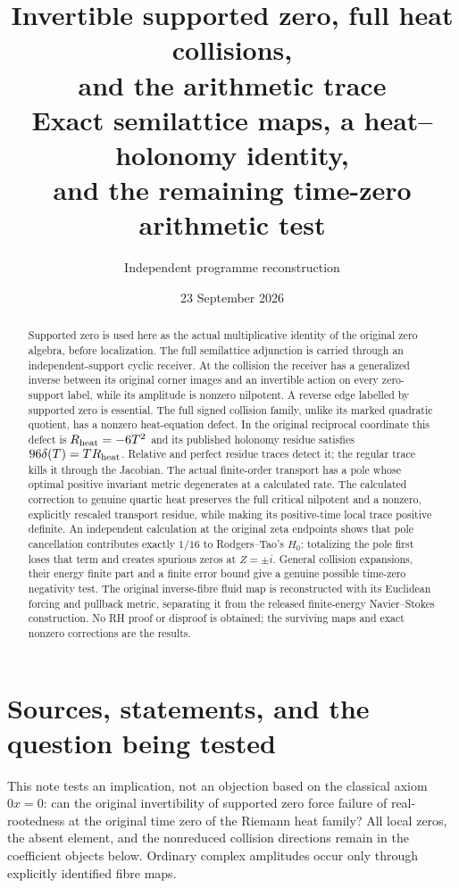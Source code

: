 \documentclass[11pt,a4paper]{article}
\title{Invertible supported zero, full heat collisions,\\and the arithmetic trace\\[4pt]\large Exact semilattice maps, a heat--holonomy identity,\\and the remaining time-zero arithmetic test}
\author{Independent programme reconstruction}
\date{23 September 2026}
\theoremstyle{definition}\newtheorem{definition}[theorem]{Definition}\newtheorem{remark}[theorem]{Remark}
\begin{document}
\maketitle
\begin{abstract}
Supported zero is used here as the actual multiplicative identity of the original zero algebra, before localization. The full semilattice adjunction is carried through an independent-support cyclic receiver. At the collision the receiver has a generalized inverse between its original corner images and an invertible action on every zero-support label, while its amplitude is nonzero nilpotent. A reverse edge labelled by supported zero is essential. The full signed collision family, unlike its marked quadratic quotient, has a nonzero heat-equation defect. In the original reciprocal coordinate this defect is $R_{\rm heat}=-6T^2$ and its published holonomy residue satisfies $96\delta(T)=TR_{\rm heat}$. Relative and perfect residue traces detect it; the regular trace kills it through the Jacobian. The actual finite-order transport has a pole whose optimal positive invariant metric degenerates at a calculated rate. The calculated correction to genuine quartic heat preserves the full critical nilpotent and a nonzero, explicitly rescaled transport residue, while making its positive-time local trace positive definite. An independent calculation at the original zeta endpoints shows that pole cancellation contributes exactly $1/16$ to Rodgers--Tao's $H_0$: totalizing the pole first loses that term and creates spurious zeros at $Z=\pm i$. General collision expansions, their energy finite part and a finite error bound give a genuine possible time-zero negativity test. The original inverse-fibre fluid map is reconstructed with its Euclidean forcing and pullback metric, separating it from the released finite-energy Navier--Stokes construction. No RH proof or disproof is obtained; the surviving maps and exact nonzero corrections are the results.
\end{abstract}
\tableofcontents\newpage

\section{Sources, statements, and the question being tested}
This note tests an implication, not an objection based on the classical axiom $0x=0$: can the original invertibility of supported zero force failure of real-rootedness at the original time zero of the Riemann heat family? All local zeros, the absent element, and the nonreduced collision directions remain in the coefficient objects below. Ordinary complex amplitudes occur only through explicitly identified fibre maps.
\end{document}
